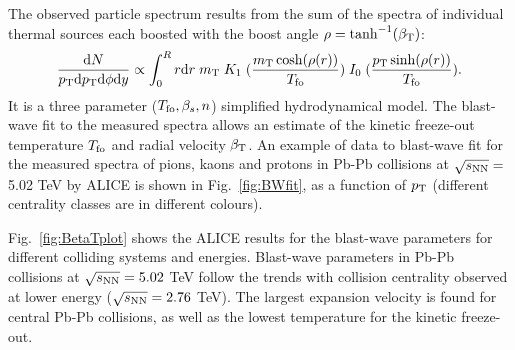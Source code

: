 The observed particle spectrum results from the sum 
of the spectra of individual thermal sources each boosted with the 
boost angle $\rho = \tanh^{-1}(\beta_{\rm T})$:
\begin{equation}
\label{eq:BlastWave}
\frac{{\rm d}N}{p_{\rm T} {\rm d}p_{\rm T} {\rm d}\phi {\rm d}y}\propto \int_{0}^{R} r {\rm d}r\;  m_{\rm T}\;  K_{1} \; (\frac{m_{\rm T} \cosh(\rho(r))}{T_{\rm fo}})\;  I_{0}\; (\frac{p_{\rm T} \sinh(\rho(r))}{T_{\rm fo}}).
\end{equation}
It is a three parameter ($T_{\rm fo}, \beta_s, n$) simplified hydrodynamical model.
The blast-wave fit to the measured spectra allows
  an estimate of the kinetic freeze-out temperature $T_{\rm fo}$ and 
  radial velocity $\beta_{\rm T}$. An example of data to blast-wave fit for the 
  measured spectra of pions, kaons and protons in Pb-Pb collisions at $\sqrt{s_{\rm NN}} = $ 5.02 TeV 
   by ALICE is shown in Fig.~\ref{fig:BWfit}, as a function of $p_{\rm T}$ (different centrality classes 
   are in different colours).
  
Fig.~\ref{fig:BetaTplot} shows the ALICE results 
for the blast-wave parameters for different colliding systems and energies. Blast-wave parameters
  in Pb-Pb collisions at $\sqrt{s_{\rm NN}} = 5.02$ TeV follow the trends with collision centrality observed at
   lower energy ($\sqrt{s_{\rm NN}} = 2.76$ TeV). The largest expansion velocity 
   is found for central Pb-Pb collisions, as well as the lowest temperature
    for the kinetic freeze-out.\\

